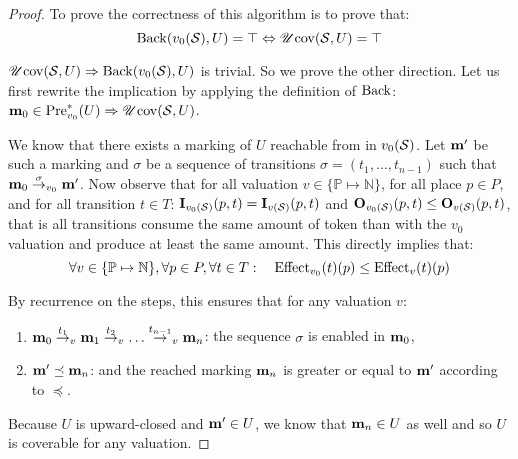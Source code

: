 \begin{proof}
  To prove the correctness of this algorithm is to prove that:
  \[
    \operatorname{Back}(v_0(\mathcal{S}), U) = \top \Leftrightarrow \operatorname{\mathscr{U}cov}(\mathcal{S}, U) = \top
  \]

$\operatorname{\mathscr{U}cov}(\mathcal{S}, U) \Rightarrow \operatorname{Back}(v_0(\mathcal{S}), U)$ is trivial. So we prove the other direction. Let us first rewrite the implication by applying the definition of $\operatorname{Back}$: $\mathbf{m}_0 \in \operatorname{Pre}_{v_0}^*(U) \Rightarrow \operatorname{\mathscr{U}cov}(\mathcal{S}, U)$.


  We know that there exists a marking of $U$ reachable from \mari in $v_0(\mathcal{S})$.
  Let $\mathbf{m'}$ be such a marking and $\sigma$ be a sequence of transitions $\sigma = (t_1, \dots, t_{n-1})$ such that $\mathbf{m}_0 \stackrel{\sigma}{\to}_{v_0} \mathbf{m'}$.
  Now observe that for all valuation $v\in \{\mathbb{P} \mapsto \mathbb{N}\}$, for all place $p \in P$, and for all transition $t \in T$: $\mathbf{I}_{v_0(\mathcal{S})}(p,t) = \mathbf{I}_{v(\mathcal{S})}(p,t)$ and $\mathbf{O}_{v_0(\mathcal{S})}(p,t) \leq \mathbf{O}_{v(\mathcal{S})}(p,t)$, that is all transitions consume the same amount of token than with the $v_0$ valuation and produce at least the same amount. This directly implies that: 
  \[
    \forall v \in \{\mathbb{P} \mapsto \mathbb{N}\}, \forall p \in P, \forall t \in T :
  \quad
  \operatorname{Effect}_{v_0}(t)(p) \leq \operatorname{Effect}_v(t)(p)
  \]

By recurrence on the steps, this ensures that for any valuation $v$:
  \begin{enumerate}
    \item $\mathbf{m}_0 \stackrel{t_1}{\to}_v \mathbf{m}_1 \stackrel{t_2}{\to}_v \dots \stackrel{t_{n-1}}{\to}_v \mathbf{m}_n$: the sequence $\sigma$ is enabled  in $\mathbf{m}_0$,
    \item $\mathbf{m'} \preceq \mathbf{m}_n$: and the reached marking $\mathbf{m}_n$ is greater or equal to $\mathbf{m'}$ according to $\preceq$.
  \end{enumerate}

  Because $U$ is upward-closed and $\mathbf{m'} \in U$, we know that $\mathbf{m}_n \in U$ as well and so $U$ is coverable for any valuation.
\end{proof}


